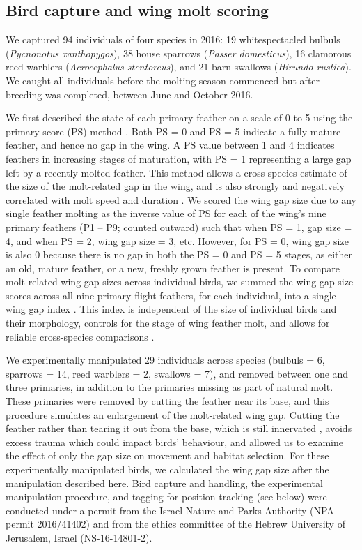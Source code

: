 \begin{refsection}
\subsection{Bird capture and wing molt scoring}

We captured 94 individuals of four species in 2016: 19 whitespectacled bulbuls (\textit{Pycnonotus xanthopygos}), 38 house sparrows (\textit{Passer domesticus}), 16 clamorous reed warblers (\textit{Acrocephalus stentoreus}), and 21 barn swallows (\textit{Hirundo rustica}).
We caught all individuals before the molting season commenced but after breeding was completed, between June and October 2016.

We first described the state of each primary feather on a scale of 0 to 5 using the primary score (PS) method \citep{ginn1983}.
Both PS = 0 and PS = 5 indicate a fully mature feather, and hence no gap in the wing.
A PS value between 1 and 4 indicates feathers in increasing stages of maturation, with PS = 1 representing a large gap left by a recently molted feather.
This method allows a cross-species estimate of the size of the molt-related gap in the wing, and is also strongly and negatively correlated with molt speed and duration \citep{rohwer2009}.
We scored the wing gap size due to any single feather molting as the inverse value of PS for each of the wing's nine primary feathers (P1 -- P9; counted outward) such that when PS = 1, gap size = 4, and when PS = 2, wing gap size = 3, etc.
However, for PS = 0, wing gap size is also 0 because there is no gap in both the PS = 0 and PS = 5 stages, as either an old, mature feather, or a new, freshly grown feather is present.
To compare molt-related wing gap sizes across individual birds, we summed the wing gap size scores across all nine primary flight feathers, for each individual, into a single wing gap index \citep{kiat2016}.
This index is independent of the size of individual birds and their morphology, controls for the stage of wing feather molt, and allows for reliable cross-species comparisons \citep{bensch1993,kiat2016}.

We experimentally manipulated 29 individuals across species {(bulbuls = 6, sparrows = 14, reed warblers = 2, swallows = 7)}, and removed between one and three primaries, in addition to the primaries missing as part of natural molt.
These primaries were removed by cutting the feather near its base, and this procedure simulates an enlargement of the molt-related wing gap.
Cutting the feather rather than tearing it out from the base, which is still innervated \cite{jenni2020}, avoids excess trauma which could impact birds' behaviour, and allowed us to examine the effect of only the gap size on movement and habitat selection.
For these experimentally manipulated birds, we calculated the wing gap size after the manipulation described here.
Bird capture and handling, the experimental manipulation procedure, and tagging for position tracking (see below) were conducted under a permit from the Israel Nature and Parks Authority (NPA permit 2016/41402) and from the ethics committee of the Hebrew University of Jerusalem, Israel (NS-16-14801-2).


\end{refsection}
